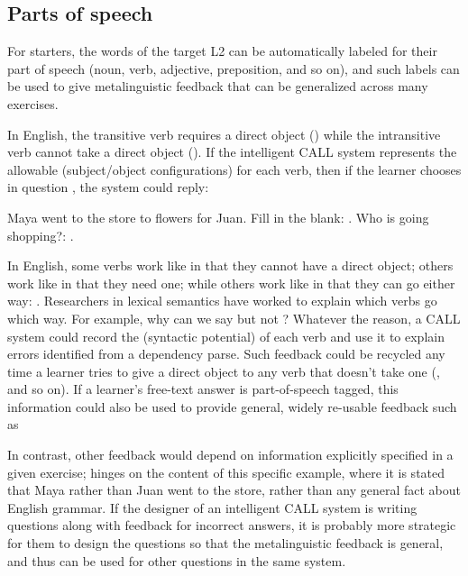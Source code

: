 \subsection{Parts of speech}

For starters, the words of the target L2 can be automatically labeled for their part of speech (noun, verb, adjective, preposition, and so on), and such labels can be used to give metalinguistic feedback that can be generalized across many exercises. 
 
In English, the transitive verb  requires a direct object () while the intransitive verb  cannot take a direct object ().  If the intelligent CALL system represents the allowable  (subject/object configurations) for each verb, then if the learner chooses  in question , the system could reply:  

\ea  Maya went to the store to \uline{\hspace{2cm}} flowers for Juan.
    \ea \label{shop}   Fill in the blank: .
    \ex \label{whoshop}  Who is going shopping?: .
\z 
\z 

In English, some verbs work like  in that they cannot have a direct object; others work like  in that they need one; while others work like  in that they can go either way: .  Researchers in lexical semantics have worked to explain which verbs go which way. For example, why can we say  but not ?  Whatever the reason, a CALL system could record the  (syntactic potential) of each verb and use it to explain errors identified from a dependency parse. Such feedback could be recycled any time a learner tries to give a direct object to any verb that doesn't take one (, and so on).   If a learner's free-text answer is part-of-speech tagged, this information could also be used to provide general, widely re-usable feedback such as 




In contrast, other feedback would depend on information explicitly specified in a given exercise;  hinges on the content of this specific example, where it is stated that Maya rather than Juan went to the store, rather than any general fact about English grammar.  If the designer of an intelligent CALL system is writing questions along with feedback for incorrect answers, it is probably more strategic for them to design the questions so that the metalinguistic feedback is general, and thus can be used for other questions in the same system.  

